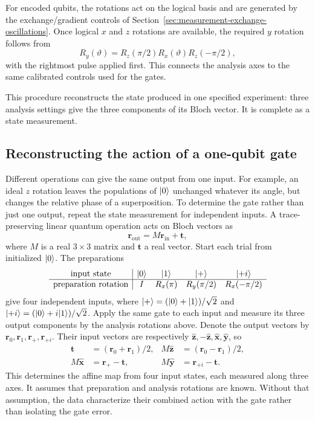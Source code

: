 For encoded qubits, the rotations act on the logical basis and
are generated by the exchange/gradient controls of
Section~\ref{sec:measurement-exchange-oscillations}. Once logical $x$ and $z$
rotations are available, the required $y$ rotation follows from
\[
 R_y(\vartheta)=R_z(\pi/2)R_x(\vartheta)R_z(-\pi/2),
\]
with the rightmost pulse applied first. This connects the analysis
axes to the same calibrated controls used for the gates.

This procedure reconstructs the state produced in one specified
experiment: three analysis settings give the three components of
its Bloch vector. It is complete as a state measurement.

\subsection{Reconstructing the action of a one-qubit gate}
\label{sec:calibration-process-tomography}

Different operations can give the same output from one input.
For example, an ideal $z$ rotation leaves the populations of
$\lvert 0\rangle$ unchanged whatever its angle, but changes the relative
phase of a superposition. To determine the gate rather than just
one output, repeat the state measurement for independent inputs. A trace-preserving
linear quantum operation acts on Bloch vectors as
\begin{equation}
 \mathbf r_{\mathrm{out}}=M\mathbf r_{\mathrm{in}}+\mathbf t,
 \label{eq:calibration-affine-channel}
\end{equation}
where $M$ is a real $3\times3$ matrix and $\mathbf t$ a real vector.
Start each trial from initialized $\lvert 0\rangle$. The preparations
\[
 \begin{array}{c|cccc}
 \text{input state}&\lvert 0\rangle&\lvert 1\rangle&\lvert +\rangle&\lvert +i\rangle\\ \hline
 \text{preparation rotation}&I&R_x(\pi)&R_y(\pi/2)&R_x(-\pi/2)
 \end{array}
\]
give four independent inputs, where
$\lvert +\rangle=(\lvert 0\rangle+\lvert 1\rangle)/\sqrt2$ and
$\lvert +i\rangle=(\lvert 0\rangle+i\lvert 1\rangle)/\sqrt2$.
Apply the same gate to each input and measure its three output
components by the analysis rotations above. Denote the output
vectors by $\mathbf r_0,\mathbf r_1,\mathbf r_+,\mathbf r_{+i}$.
Their input vectors are respectively
$\hat{\mathbf z},-\hat{\mathbf z},\hat{\mathbf x},\hat{\mathbf y}$,
so
\begin{equation}
 \begin{aligned}
 \mathbf t&=(\mathbf r_0+\mathbf r_1)/2,&
 M\hat{\mathbf z}&=(\mathbf r_0-\mathbf r_1)/2,\\
 M\hat{\mathbf x}&=\mathbf r_+-\mathbf t,&
 M\hat{\mathbf y}&=\mathbf r_{+i}-\mathbf t.
 \end{aligned}
 \label{eq:calibration-process-reconstruction}
\end{equation}
This determines the affine map from four input states, each measured
along three axes. It assumes that preparation and analysis rotations
are known. Without that assumption, the data characterize their
combined action with the gate rather than isolating the gate error.

